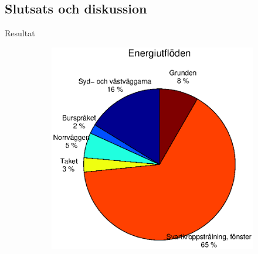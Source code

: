 \subsection{Slutsats och diskussion}

\begin{frame}{Resultat}


\begin{figure}
        \begin{subfigure}[b]{0.5\textwidth}
                \centering
                \includegraphics[width=\textwidth]{images/totalflow_in.eps}
        \end{subfigure}
        \begin{subfigure}[b]{0.5\textwidth}
                \centering

\end{subfigure}
\end{figure}
\end{frame}
